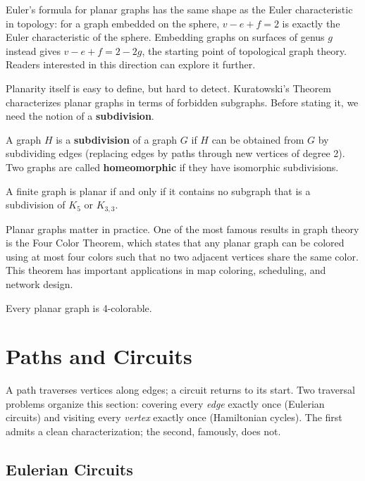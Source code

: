 Euler's formula for planar graphs has the same shape as the Euler characteristic in topology: for a graph embedded on the sphere, $v - e + f = 2$ is exactly the Euler characteristic of the sphere. Embedding graphs on surfaces of genus $g$ instead gives $v - e + f = 2 - 2g$, the starting point of topological graph theory. Readers interested in this direction can explore it further.

Planarity itself is easy to define, but hard to detect. Kuratowski's Theorem characterizes planar graphs in terms of forbidden subgraphs. Before stating it, we need the notion of a \textbf{subdivision}.

\begin{definition}
A graph $H$ is a \textbf{subdivision} of a graph $G$ if $H$ can be obtained from $G$ by subdividing edges (replacing edges by paths through new vertices of degree 2). Two graphs are called \textbf{homeomorphic} if they have isomorphic subdivisions.
\end{definition}

\begin{theorem}
A finite graph is planar if and only if it contains no subgraph that is a subdivision of $K_5$ or $K_{3,3}$.
\end{theorem}

Planar graphs matter in practice. One of the most famous results in graph theory is the Four Color Theorem, which states that any planar graph can be colored using at most four colors such that no two adjacent vertices share the same color. This theorem has important applications in map coloring, scheduling, and network design.

\begin{theorem}
Every planar graph is 4-colorable.
\end{theorem}

\section{Paths and Circuits}

A path traverses vertices along edges; a circuit returns to its start. Two traversal problems organize this section: covering every \emph{edge} exactly once (Eulerian circuits) and visiting every \emph{vertex} exactly once (Hamiltonian cycles). The first admits a clean characterization; the second, famously, does not.

\subsection{Eulerian Circuits}

